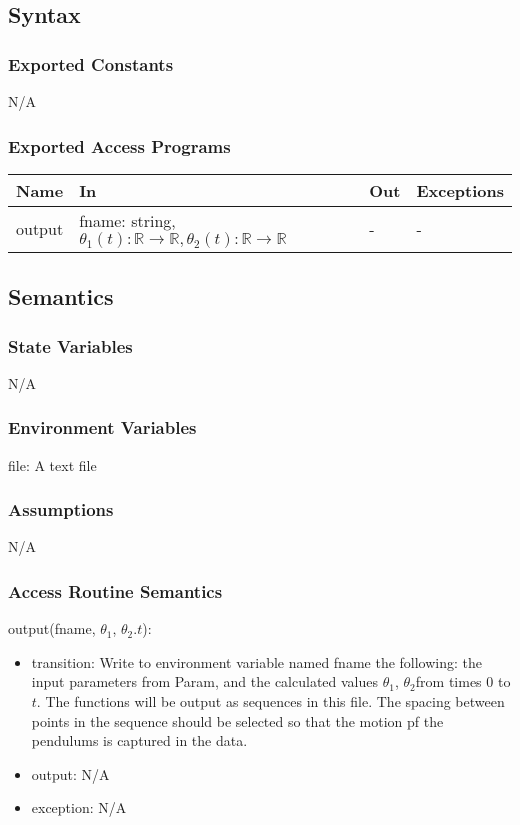 \documentclass[12pt, titlepage]{article}
\begin{document}
\subsection{Syntax}

\subsubsection{Exported Constants}
N/A
\subsubsection{Exported Access Programs}

\begin{center}
\begin{tabular}{p{3cm} p{7cm} p{2cm} p{2cm}}
\hline
\textbf{Name} & \textbf{In} & \textbf{Out} & \textbf{Exceptions} \\
\hline
output & fname: string, $\theta_1(t):\mathbb{R} \rightarrow \mathbb{R},
                 \theta_2(t):\mathbb{R} \rightarrow \mathbb{R}$ & - & - \\
\hline
\end{tabular}
\end{center}

\subsection{Semantics}

\subsubsection{State Variables}
N/A

\subsubsection{Environment Variables}

file: A text file
\subsubsection{Assumptions}

N/A
\subsubsection{Access Routine Semantics}

\noindent output(fname, $\theta_1$, $\theta_2$.$t$):
\begin{itemize}
\item transition:  Write to environment variable named fname the
  following: the input
    parameters from Param, and the calculated values $\theta_1$, $\theta_2$from times $0$ to $t$.  The functions will be output as
    sequences in this file.  The spacing between points in the sequence should
    be selected so that the motion pf the pendulums is captured in the data.
\item output: N/A
\item exception: N/A
\end{itemize}
\end{document}
